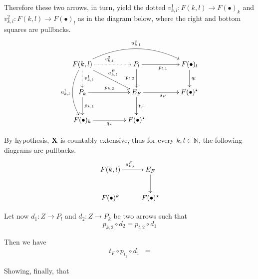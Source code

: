 \documentclass[runningheads,envcountsect]{llncs}
\def\X{\textbf {\textup{X}}}
\begin{document}
\begin{remark}
	Therefore these two arrows, in turn, yield the dotted $v^1_{k,l}\colon F(k,l)\to F(\bullet)_k $ and $v^2_{k,l}\colon F(k,l)\to F(\bullet)_l$ as in the diagram below, where the right and bottom squares are pullbacks.
	\[\xymatrix@C=45pt{F(k,l)  \ar[dr]^{a^F_{k,l}} \ar@{.>}[r]^{v^2_{k,l}} \ar@{.>}[d]^{v^1_{k,l}} \ar@/^.8cm/[rr]^{u^2_{k,l}} \ar@/_.5cm/[dd]_{u^1_{k,l}}& P_{l} \ar[r]_{p_{l,1}} \ar[d]_{p_{l,2}}& F(\bullet)_{l} \ar[d]^{q_{l}}\\ P_k \ar[r]^{p_{k,2}} \ar[d]^{p_{k,1}}& E_F \ar[r]_{s_F}  \ar[d]^{t_F}& F(\bullet)^\star \\ F(\bullet)_k  \ar[r]_{q_{k}}& F(\bullet)^\star}\]
	
 By hypothesis, $\X$ is countably extensive, thus for every $k, l\in \mathbb{N}$, the following diagrams are pullbacks.
 \[\xymatrix{F(k,l) \ar[r]^{a^F_{k,l}} & E_F \ar[d]^{}\\ 
 F(\bullet)^k& F(\bullet)^\star}\]
 
 
 Let now $d_1\colon Z\to P_l$ and $d_2\colon Z\to P_k $ be two arrows such that
 \[p_{k,2}\circ d_2=p_{t,2}\circ d_1\]
 
 Then we have
 \begin{align*}
 t_{F}\circ 	p_{t_2}\circ d_1&= \end{align*}
 
 
 Showing, finally, that
 \fi  
\end{remark}
\end{document}
